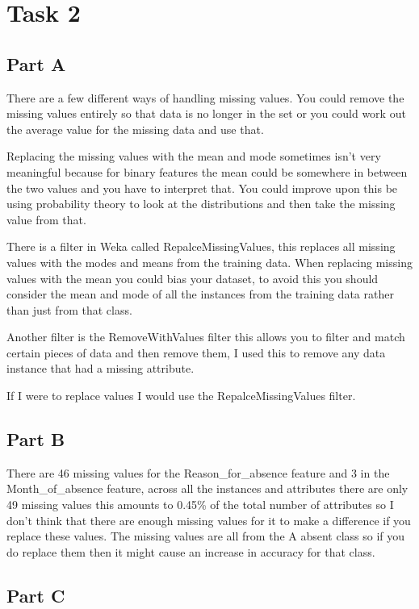 \documentclass[10pt]{article}
\begin{document}
\section*{Task 2}

\subsection*{Part A}
There are a few different ways of handling missing values. You could remove the missing values entirely so that data is no longer in the set or you could work out the average value for the missing data and use that. 

Replacing the missing values with the mean and mode sometimes isn't very meaningful because for binary features the mean could be somewhere in between the two values and you have to interpret that. You could improve upon this be using probability theory to look at the distributions and then take the missing value from that.

There is a filter in Weka called RepalceMissingValues, this replaces all missing values with the modes and means from the training data. When replacing missing values with the mean you could bias your dataset, to avoid this you should consider the mean and mode of all the instances from the training data rather than just from that class.

Another filter is the RemoveWithValues filter this allows you to filter and match certain pieces of data and then remove them, I used this to remove any data instance that had a missing attribute. 

If I were to replace values I would use the RepalceMissingValues filter.

\subsection*{Part B}
There are 46 missing values for the Reason\_for\_absence feature and 3 in the Month\_of\_absence feature, across all the instances and attributes there are only 49 missing values this amounts to 0.45\% of the total number of attributes so I don't think that there are enough missing values for it to make a difference if you replace these values. The missing values are all from the A absent class so if you do replace them then it might cause an increase in accuracy for that class.

\subsection*{Part C}
\end{document}
